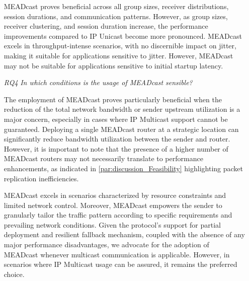 \begin{itemize}
    MEADcast proves beneficial across all group sizes, receiver distributions,
        session durations, and communication patterns.
    However, as group sizes, receiver clustering, and session duration
        increase, the performance improvements compared to IP Unicast become
        more pronounced.
    MEADcast excels in throughput-intense scenarios, with no discernible impact
        on jitter, making it suitable for applications sensitive to jitter.
    However, MEADcast may not be suitable for applications sensitive to initial
        startup latency.

\item[\textit{RQ4}]
    \textit{In which conditions is the usage of MEADcast sensible?}

    The employment of MEADcast proves particularly beneficial when the
        reduction of the total network bandwidth or sender upstream utilization
        is a major concern, especially in cases where IP Multicast support
        cannot be guaranteed.
    Deploying a single MEADcast router at a strategic location can
        significantly reduce bandwidth utilization between the sender and
        router.
    However, it is important to note that the presence of a higher number of
        MEADcast routers may not necessarily translate to performance
        enhancements, as indicated in \autoref{par:discussion_Feasibility}
        highlighting packet replication inefficiencies.

    MEADcast excels in scenarios characterized by resource constraints and
        limited network control.
    Moreover, MEADcast empowers the sender to granularly tailor the traffic
        pattern according to specific requirements and prevailing network
        conditions.
    Given the protocol's support for partial deployment and resilient fallback
        mechanism, coupled with the absence of any major performance
        disadvantages, we advocate for the adoption of MEADcast whenever
        multicast communication is applicable.
    However, in scenarios where IP Multicast usage can be assured, it remains
        the preferred choice.

\end{itemize}


